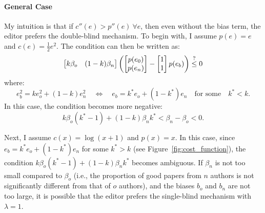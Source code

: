 \documentclass[12pt]{article}
\begin{document}
\paragraph{General Case}
My intuition is that if $c''(e) > p''(e) \ \forall e$, then even without the
bias term, the editor prefers the double-blind mechanism. To begin with, I
assume $p(e) = e$ and $c(e) = \frac{1}{2} e^2$. The condition can then be
written as:
\begin{equation*}
    \begin{bmatrix}
        k\beta_o & (1-k)\beta_n
    \end{bmatrix}
    \left(
        \begin{bmatrix}
            p(e_0) \\ p(e_n)
        \end{bmatrix}
        -
        \begin{bmatrix}
            1 \\ 1
        \end{bmatrix}
        p(e_b)\right)
    \stackrel{?}{\leq} 0
\end{equation*}
where:
\[
    e_b^2 = k e_o^2 + (1 - k) e_n^2 \quad \Leftrightarrow \quad e_b = k^* e_o + (1 - k^*) e_n \quad \text{for some} \quad k^* < k.
\]
In this case, the condition becomes more negative:
\begin{equation*}
    k \beta_o (k^* - 1) + (1 - k) \beta_n k^* < \beta_n - \beta_o < 0.
\end{equation*}

Next, I assume $c(x) = \log(x + 1)$ and $p(x) = x$. In this case, since $e_b =
    k^* e_o + (1 - k^*) e_n$ for some $k^* > k$ (see
Figure~\ref{fig:cost_function}), the condition $k \beta_o (k^* - 1) + (1 - k)
    \beta_n k^*$ becomes ambiguous. If $\beta_n$ is not too small compared to
$\beta_o$ (i.e., the proportion of good papers from $n$ authors is not
significantly different from that of $o$ authors), and the biases $b_o$ and
$b_n$ are not too large, it is possible that the editor prefers the
single-blind mechanism with $\lambda = 1$.
\end{document}
